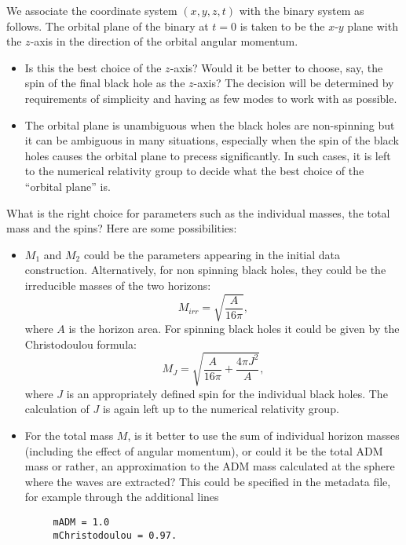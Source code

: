 \documentclass[prd,preprintnumbers,superscriptaddress,eqsecnum]{revtex4}
\numberwithin{equation}{section}
\begin{document}
We associate the coordinate system $(x,y,z,t)$ with the binary system
as follows. The orbital plane of the binary at $t=0$ is taken to be
the $x$-$y$ plane with the $z$-axis in the direction of the orbital
angular momentum.
\begin{itemize}
\item Is this the best choice of the $z$-axis?  Would it be better to
  choose, say, the spin of the final black hole as the $z$-axis? The
  decision will be determined by requirements of simplicity and
  having as few modes to work with as possible.
\item The orbital plane is unambiguous when the black holes are non-spinning
  but it can be ambiguous in many situations, especially when the spin
  of the black holes causes the orbital plane to precess significantly.
  In such cases, it is left to the numerical relativity group to decide
  what the best choice of the ``orbital plane'' is.
\end{itemize}
What is the right choice for parameters such as the individual masses,
the total mass and the spins?  Here are some possibilities:
\begin{itemize}
\item $M_1$ and $M_2$ could be the parameters appearing in the initial
  data construction. Alternatively, for non spinning black holes,
  they could be the irreducible masses of the two horizons:
  \begin{equation}
    \label{eq:12}
    M_{irr} = \sqrt{\frac{A}{16\pi}},
  \end{equation}
  where $A$ is the horizon area. For spinning black holes it could be
  given by the Christodoulou formula:
  \begin{equation}
    \label{eq:13}
    M_{J} = \sqrt{\frac{A}{16\pi} + \frac{4\pi J^2}{A}},
  \end{equation}
  where $J$ is an appropriately defined spin for the individual black
  holes. The calculation of $J$ is again left up to the numerical
  relativity group.
\item For the total mass $M$, is it better to use the sum of individual
  horizon masses (including the effect of angular momentum), or could
  it be the total ADM mass or rather, an approximation to the ADM mass
  calculated at the sphere where the waves are extracted? This could
  be specified in the metadata file, for example through the additional lines
  \begin{verbatim}
     mADM = 1.0
     mChristodoulou = 0.97.
  \end{verbatim}
\end{itemize}
\end{document}
